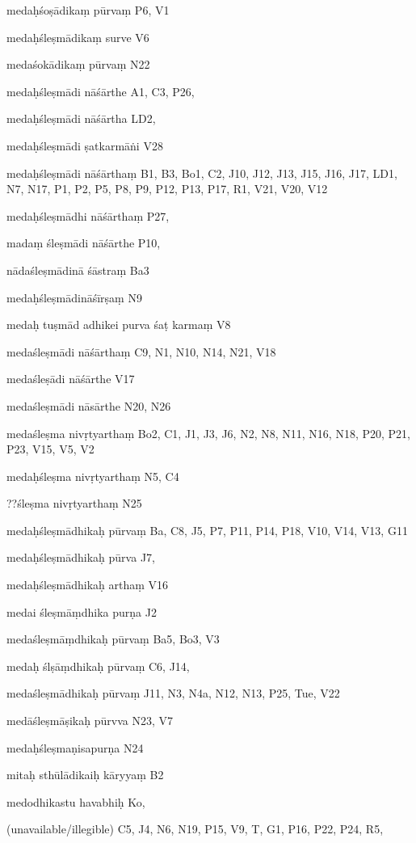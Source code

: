 \begin{marma}[hp02_009]
\begin{marma}[hp02_011]
 \begin{marma}[hp02_021]
\item[medaḥśoṣādikaṃ pūrvaṃ] P6, V1
\item[medaḥśleṣmādikaṃ surve] V6
\item[medaśokādikaṃ pūrvaṃ] N22
\item[medaḥśleṣmādi nāśārthe] A1, C3, P26, 
\item[medaḥśleṣmādi nāśārtha] LD2,
\item[medaḥśleṣmādi ṣatkarmāṅi] V28
\item[medaḥśleṣmādi nāśārthaṃ] B1, B3, Bo1, C2, J10, J12, J13, J15, J16, J17, LD1, N7, N17, P1, P2, P5, P8, P9, P12, P13, P17, R1, V21, V20, V12
\item[medaḥśleṣmādhi nāśārthaṃ] P27, 
\item[madaṃ śleṣmādi nāśārthe] P10, 
\item[nādaśleṣmādinā śāstraṃ] Ba3
\item[medaḥśleṣmādināśīrṣaṃ] N9
\item[medaḥ tuṣmād adhikei purva śaṭ karmaṃ] V8
\item[medaśleṣmādi nāśārthaṃ] C9, N1, N10, N14, N21, V18
\item[medaśleṣādi nāśārthe] V17
\item[medaśleṣmādi nāsārthe] N20, N26
\item[medaśleṣma nivṛtyarthaṃ] Bo2, C1, J1, J3, J6, N2, N8, N11, N16, N18, P20, P21, P23, V15, V5, V2
\item[medaḥśleṣma nivṛtyarthaṃ] N5, C4
\item[??śleṣma nivṛtyarthaṃ] N25
\item[medaḥśleṣmādhikaḥ pūrvaṃ] Ba, C8, J5, P7, P11, P14, P18, V10, V14, V13, G11
\item[medaḥśleṣmādhikaḥ pūrva] J7,
\item[medaḥśleṣmādhikaḥ arthaṃ] V16
\item[medai śleṣmāṃdhika purṇa] J2
\item[medaśleṣmāṃdhikaḥ pūrvaṃ] Ba5, Bo3, V3
\item[medaḥ ślṣāṃdhikaḥ pūrvaṃ] C6, J14, 
\item[medaśleṣmādhikaḥ pūrvaṃ]  J11, N3, N4a, N12, N13, P25, Tue, V22
\item[medāśleṣmāṣikaḥ pūrvva] N23, V7
\item[medaḥśleṣmaṇisapurṇa] N24 
\item[mitaḥ sthūlādikaiḥ kāryyaṃ] B2
\item[medodhikastu havabhiḥ] Ko,
\item[(unavailable/illegible)] C5, J4, N6, N19, P15, V9, T, G1, P16, P22, P24, R5,
  \begin{description}


\end{description}
\end{marma}
\end{marma}
\end{marma}
